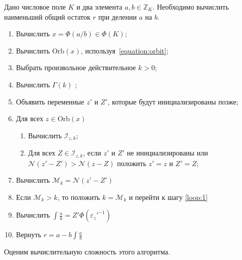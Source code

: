 \documentclass[_00_dissertation.tex]{subfiles}
\begin{document}
\begin{algorithm}\label{algorithm:least_norm_remainder}
    Дано числовое поле $K$ и два элемента $a, b \in \mathbb{Z}_K$.
    Необходимо вычислить наименьший общий остаток $r$ при делении $a$ на $b$.

    \begin{enumerate}
        \item Вычислить $x = \Phi(a/b) \in \Phi(K)$;
        
        \item Вычислить $\textrm{Orb}(x)$, используя~\ref{equation:orbit};

        \item Выбрать произвольное действительное $k > 0$;

        \item Вычислить $\Gamma(k)$ \label{loop:1};

        \item Объявить переменные $z'$ и $Z'$, которые будут инициализированы позже;

        \item Для всех $z \in \textrm{Orb}(x)$
        \begin{enumerate}
            \item Вычислить $\mathcal{I}_{z, k}$;

            \item Для всех $Z \in \mathcal{I}_{z, k}$, если $z'$ и $Z'$ не инициализированы или $\mathcal{N}(z' - Z') > \mathcal{N}(z - Z)$ положить $z' = z$ и $Z' = Z$;
        \end{enumerate}

        \item Вычислить $\mathcal{M}_k = \mathcal{N}(z' - Z')$
        
        \item Если $\mathcal{M}_k > k$, то положить $k = \mathcal{M}_k$ и перейти к шагу \ref{loop:1}

        \item Вычислить $\int{\frac{a}{b}} = Z'\Phi(\varepsilon_z'^{-1})$

        \item Вернуть $r = a - b \int{\frac{a}{b}}$
    \end{enumerate}
\end{algorithm}

Оценим вычислительную сложность этого алгоритма.
\end{document}
